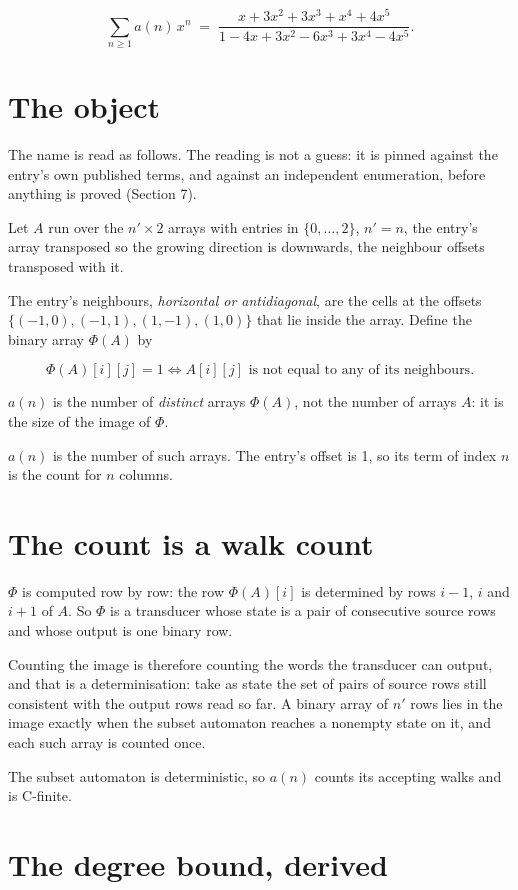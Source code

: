 \documentclass[11pt]{article}
\theoremstyle{definition}
\begin{document}
\[\sum_{n \ge 1} a(n)\,x^n \;=\; \frac{x + 3x^{2} + 3x^{3} + x^{4} + 4x^{5}}{1 - 4x + 3x^{2} - 6x^{3} + 3x^{4} - 4x^{5}}.\]

\section{The object}

The name is read as follows. The reading is not a guess: it is pinned against the entry's own published terms, and against an independent enumeration, before anything is proved (Section 7).

Let $A$ run over the $n' \times 2$ arrays with entries in $\{0,\dots,2\}$, $n' = n$, the entry's array transposed so the growing direction is downwards, the neighbour offsets transposed with it.

The entry's neighbours, {\itshape horizontal or antidiagonal}, are the cells at the offsets $\{(-1,0), (-1,1), (1,-1), (1,0)\}$ that lie inside the array. Define the binary array $\Phi(A)$ by

\[\Phi(A)[i][j] = 1 \iff A[i][j] \text{ is not equal to any of its neighbours}.\]

$a(n)$ is the number of {\itshape distinct} arrays $\Phi(A)$, not the number of arrays $A$: it is the size of the image of $\Phi$.

$a(n)$ is the number of such arrays. The entry's offset is 1, so its term of index $n$ is the count for $n$ columns.

\section{The count is a walk count}

$\Phi$ is computed row by row: the row $\Phi(A)[i]$ is determined by rows $i-1$, $i$ and $i+1$ of $A$. So $\Phi$ is a transducer whose state is a pair of consecutive source rows and whose output is one binary row.

Counting the image is therefore counting the words the transducer can output, and that is a determinisation: take as state the set of pairs of source rows still consistent with the output rows read so far. A binary array of $n'$ rows lies in the image exactly when the subset automaton reaches a nonempty state on it, and each such array is counted once.

The subset automaton is deterministic, so $a(n)$ counts its accepting walks and is C-finite.

\section{The degree bound, derived}
\end{document}
